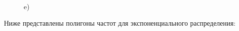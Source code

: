 \documentclass[a4paper,12pt, oneside]{book}
\begin{document}
\begin{figure}[h!]
\begin{center}
\begin{minipage}[h]{0.47\linewidth}
			 e) \\
			\vspace{10mm}
		\end{minipage}
	\end{center}
\end{figure}

\newpage
Ниже представлены полигоны частот для экспоненциального  распределения:\\
\end{document}
